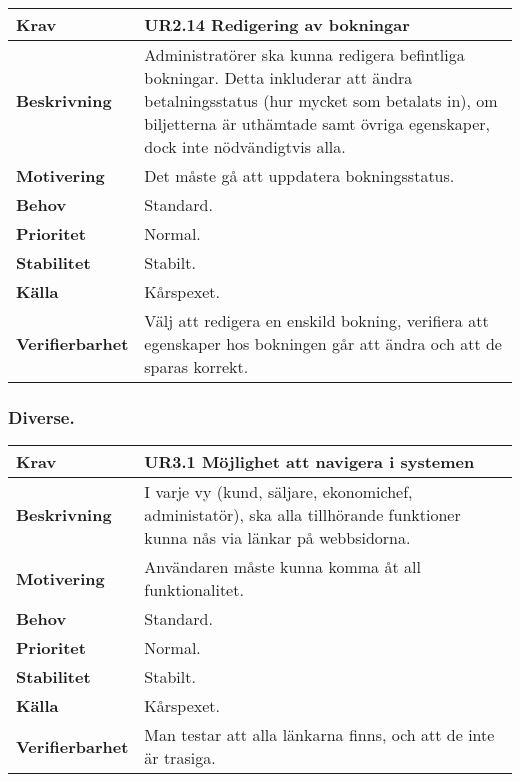 \documentclass[a4paper, twoside, 11pt, titlepage]{article}
\begin{document}
		\begin {table} [ht] \begin{tabular} { p{2.6cm} p{12.5cm} }
			\hline
			{\sffamily\textbf{Krav}} & {\sffamily\textbf{UR2.14 Redigering av bokningar }} \\
			\hline
			{\sffamily\textbf{Beskrivning}} & {Administratörer ska kunna redigera befintliga bokningar. Detta inkluderar att ändra betalningsstatus (hur mycket som betalats in), om biljetterna är uthämtade samt övriga egenskaper, dock inte nödvändigtvis alla.} \\
			\hline
			{\sffamily\textbf{Motivering}} & {Det måste gå att uppdatera bokningsstatus.} \\
			\hline
			{\sffamily\textbf{Behov}} & {Standard.} \\
			\hline
			{\sffamily\textbf{Prioritet}} & {Normal.} \\
			\hline
			{\sffamily\textbf{Stabilitet}} & {Stabilt.} \\
			\hline
			{\sffamily\textbf{Källa}} & {Kårspexet.} \\
			\hline
			{\sffamily\textbf{Verifierbarhet}} & {Välj att redigera en enskild bokning, verifiera att egenskaper hos bokningen går att ändra och att de sparas korrekt.} \\
			\hline
		\end{tabular} \end{table} \FloatBarrier


		\subsubsection{Diverse.}


		\begin {table} [ht] \begin{tabular} { p{2.6cm} p{12.5cm} }
			\hline
			{\sffamily\textbf{Krav}} & {\sffamily\textbf{UR3.1 Möjlighet att navigera i systemen }} \\
			\hline
			{\sffamily\textbf{Beskrivning}} & {I varje vy (kund, säljare, ekonomichef, administatör), ska alla tillhörande funktioner kunna nås via länkar på webbsidorna.} \\
			\hline
			{\sffamily\textbf{Motivering}} & {Användaren måste kunna komma åt all funktionalitet.} \\
			\hline
			{\sffamily\textbf{Behov}} & {Standard.} \\
			\hline
			{\sffamily\textbf{Prioritet}} & {Normal.} \\
			\hline
			{\sffamily\textbf{Stabilitet}} & {Stabilt.} \\
			\hline
			{\sffamily\textbf{Källa}} & {Kårspexet.} \\
			\hline
			{\sffamily\textbf{Verifierbarhet}} & {Man testar att alla länkarna finns, och att de inte är trasiga.} \\
			\hline
		\end{tabular} \end{table} \FloatBarrier
\end{document}
